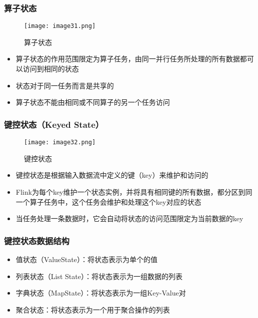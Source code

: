 \documentclass{beamer}
\begin{document}
  \begin{frame}
      \frametitle{算子状态}

      \begin{figure}
        \centering
        \texttt{[image: image31.png]}
        \caption{算子状态}
      \end{figure}
  
      \begin{itemize}
          \item 算子状态的作用范围限定为算子任务，由同一并行任务所处理的所有数据都可以访问到相同的状态
          \item 状态对于同一任务而言是共享的
          \item 算子状态不能由相同或不同算子的另一个任务访问
      \end{itemize}
  
  \end{frame}

  \begin{frame}
      \frametitle{键控状态（Keyed State）}

      \begin{figure}
          \centering
          \texttt{[image: image32.png]}
          \caption{键控状态}
      \end{figure}
  
      \begin{itemize}
          \item 键控状态是根据输入数据流中定义的键（key）来维护和访问的
          \item Flink为每个key维护一个状态实例，并将具有相同键的所有数据，都分区到同一个算子任务中，这个任务会维护和处理这个key对应的状态
          \item 当任务处理一条数据时，它会自动将状态的访问范围限定为当前数据的key
      \end{itemize}
  
  \end{frame}

  \begin{frame}
      \frametitle{键控状态数据结构}
  
      \begin{itemize}
          \item 值状态（ValueState）：将状态表示为单个的值
          \item 列表状态（List State）：将状态表示为一组数据的列表
          \item 字典状态（MapState）：将状态表示为一组Key-Value对
          \item 聚合状态：将状态表示为一个用于聚合操作的列表
      \end{itemize}
  
  \end{frame}
\end{document}
